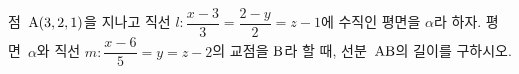 점~$\mathrm{A}(3{,}\mkern3mu\mathopen{}2{,}\mkern3mu\mathopen{}1)$을 지나고 직선 $l\colon \dfrac{x-3}{3}=\dfrac{2-y}{2}=z-1$에 수직인 평면을 $\alpha$라 하자. 평면~$\alpha$와 직선 $m\colon \dfrac{x-6}{5}=y=z-2$의 교점을 $\mathrm{B}$라 할 때, 선분~$\mathrm{AB}$의 길이를 구하시오.
